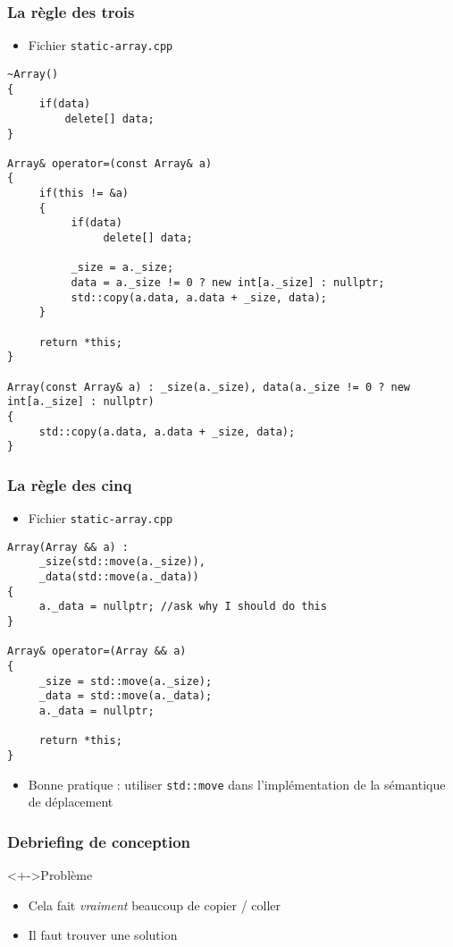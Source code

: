 \begin{frame}[containsverbatim]
\frametitle{La règle des trois}
\begin{itemize}
\item Fichier \texttt{static-array.cpp}
\end{itemize}
\begin{lstlisting}
~Array()
{
     if(data)
         delete[] data;
}
    
Array& operator=(const Array& a)
{
     if(this != &a)
     {
          if(data)
               delete[] data;
                
          _size = a._size;
          data = a._size != 0 ? new int[a._size] : nullptr;
          std::copy(a.data, a.data + _size, data);
     }
           
     return *this;
}
    
Array(const Array& a) : _size(a._size), data(a._size != 0 ? new int[a._size] : nullptr)
{
     std::copy(a.data, a.data + _size, data);
}
\end{lstlisting}
\end{frame}

\begin{frame}[containsverbatim]
\frametitle{La règle des cinq}\begin{itemize}
\item Fichier \texttt{static-array.cpp}
\end{itemize}
\begin{lstlisting}
Array(Array && a) :
     _size(std::move(a._size)),
     _data(std::move(a._data))
{            
     a._data = nullptr; //ask why I should do this
}
    
Array& operator=(Array && a)
{
     _size = std::move(a._size);
     _data = std::move(a._data);
     a._data = nullptr;            
            
     return *this;
}
\end{lstlisting}
\begin{itemize}
\item Bonne pratique : utiliser \texttt{std::move} dans l'implémentation de la sémantique de déplacement
\end{itemize}
\end{frame}

\begin{frame}
\frametitle{Debriefing de conception}
\begin{alertblock}<+->{Problème}
\begin{itemize}[<+->]
\item Cela fait \emph{vraiment} beaucoup de copier / coller
\end{itemize}
\end{alertblock}
\begin{itemize}[<+->]
\item Il faut trouver une solution
\end{itemize}
\end{frame}

